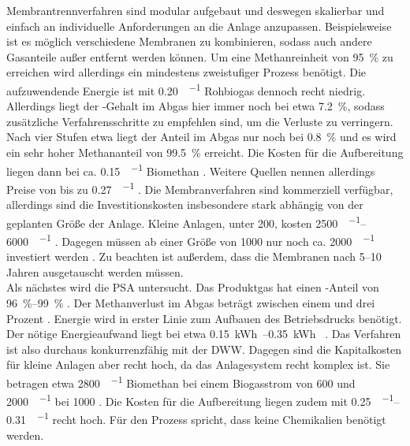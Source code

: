 Membrantrennverfahren sind modular aufgebaut und deswegen skalierbar und einfach an individuelle Anforderungen an die Anlage anzupassen. Beispielsweise ist es möglich verschiedene Membranen zu kombinieren, sodass auch andere Gasanteile außer  entfernt werden können. Um eine Methanreinheit von \SI{95}{\percent} zu erreichen wird allerdings ein mindestens zweistufiger Prozess benötigt. Die aufzuwendende Energie ist mit \SI{0,20}{\kwh\per\normvol} Rohbiogas dennoch recht niedrig. Allerdings liegt der -Gehalt im Abgas hier immer noch bei etwa \SI{7,2}{\percent}, sodass zusätzliche Verfahrensschritte zu empfehlen sind, um die Verluste zu verringern. Nach vier Stufen etwa liegt der Anteil im Abgas nur noch bei \SI{0,8}{\percent} und es wird ein sehr hoher Methananteil von \SI{99,5}{\percent} erreicht. Die Kosten für die Aufbereitung liegen dann bei ca. \SI{0,15}{\sieuro\per\normvol} Biomethan \parencite{Miltner2016}. Weitere Quellen nennen allerdings Preise von bis zu \SI{0,27}{\sieuro\per\normvol} \parencite{Emp18}. Die Membranverfahren sind kommerziell verfügbar, allerdings sind die Investitionskosten insbesondere stark abhängig von der geplanten Größe der Anlage. Kleine Anlagen, unter \SI{200}{\normvolh}, kosten \SIrange{2500}{6000}{\sieuro\per\normvolh} \parencite{BHPT13}. Dagegen müssen ab einer Größe von \SI{1000}{\normvolh} nur noch ca. \SI{2000}{\sieuro\per\normvolh} investiert werden \parencite{BHPT13}. Zu beachten ist außerdem, dass die Membranen nach \SIrange{5}{10}{\relax} Jahren ausgetauscht werden müssen. \parencite{Miltner2016} \parencite{KGKK2019} \\

Als nächstes wird die \gls{PSA} untersucht. Das Produktgas hat einen -Anteil von \SIrange{96}{99}{\percent} \parencite{DSW15} \parencite{KGKK2019}. Der Methanverlust im Abgas beträgt zwischen einem und drei Prozent \parencite{KGKK2019} \parencite{dena2019}. 
Energie wird in erster Linie zum Aufbauen des Betriebsdrucks benötigt. Der nötige Energieaufwand liegt bei etwa \SIrange{0,15}{0,35}{\kWh\normvol} \parencite{Coll17}. Das Verfahren ist also durchaus konkurrenzfähig mit der \gls{DWW}. Dagegen sind die Kapitalkosten für kleine Anlagen aber recht hoch, da das Anlagesystem recht komplex ist. Sie betragen etwa \SI{2800}{\sieuro\per\normvolh} Biomethan bei einem Biogasstrom von \SI{600}{\normvolh} und \SI{2000}{\sieuro\per\normvolh} bei \SI{1000}{\normvolh} \parencite{BHPT13}.
Die Kosten für die Aufbereitung liegen zudem mit \SIrange{0,25}{0,31}{\sieuro\per\normvol} recht hoch.
Für den Prozess spricht, dass keine Chemikalien benötigt werden. \parencite{AONC2019} \\

